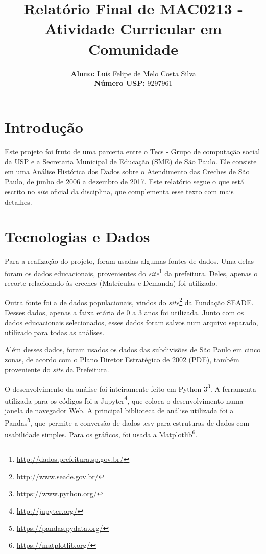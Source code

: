 \documentclass[12pt, a4paper]{article}
\title{\textbf{Relatório Final de MAC0213 - Atividade Curricular em Comunidade}}
\author{
    \textbf{Aluno:} Luís Felipe de Melo Costa Silva \\
    \textbf{Número USP:} 9297961
    }
\date{}
\begin{document}
\maketitle

\section*{Introdução}

Este projeto foi fruto de uma parceria entre o Tecs - Grupo de computação social da USP e a Secretaria Municipal de Educação (SME) de São Paulo. Ele consiste em uma Análise Histórica dos Dados sobre o Atendimento das Creches de São Paulo, de junho de 2006 a dezembro de 2017. Este relatório segue o que está escrito no \href{https://lsflp.github.io/MAC0213/}{\textit{site}} oficial da disciplina, que complementa esse texto com mais detalhes.

\section{Tecnologias e Dados}

Para a realização do projeto, foram usadas algumas fontes de dados. Uma delas foram os dados educacionais, provenientes do \textit{site}\footnote{\url{http://dados.prefeitura.sp.gov.br/}} da prefeitura. Deles, apenas o recorte relacionado às creches (Matrículas e Demanda) foi utilizado.

Outra fonte foi a de dados populacionais, vindos do \textit{site}\footnote{\url{http://www.seade.gov.br/}} da Fundação SEADE. Desses dados, apenas a faixa etária de 0 a 3 anos foi utilizada. Junto com os dados educacionais selecionados, esses dados foram salvos num arquivo separado, utilizado para todas as análises.

Além desses dados, foram usados os dados das subdivisões de São Paulo em cinco zonas, de acordo com o Plano Diretor Estratégico de 2002 (PDE), também proveniente do \textit{site} da Prefeitura.

O desenvolvimento da análise foi inteiramente feito em Python 3\footnote{\url{https://www.python.org/}}. A ferramenta utilizada para os códigos foi a Jupyter\footnote{\url{http://jupyter.org/}}, que coloca o desenvolvimento numa janela de navegador Web. A principal biblioteca de análise utilizada foi a Pandas\footnote{\url{https://pandas.pydata.org/}}, que permite a conversão de dados .csv para estruturas de dados com usabilidade simples. Para os gráficos, foi usada a Matplotlib\footnote{\url{https://matplotlib.org/}}.
\end{document}
